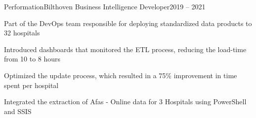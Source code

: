 \resumeSubheading
  {Performation}{Bilthoven}
  {Business Intelligence Developer}{2019 – 2021}
  \vspace{-2.0mm}
  \resumeItemListStart
\item Part of the DevOps team responsible for deploying standardized data products to 32 hospitals
\item Introduced dashboards that monitored the ETL process, reducing the load-time from 10 to 8 hours
\item Optimized the update process, which resulted in a 75\% improvement in time spent per hospital
\item Integrated the extraction of Afas - Online data for 3 Hospitals using PowerShell and SSIS
  \resumeItemListEnd 